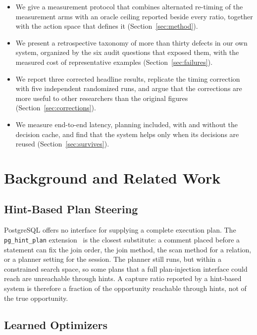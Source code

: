 \documentclass[conference]{IEEEtran}
\begin{document}
\begin{itemize}
  \item We give a measurement protocol that combines alternated re-timing of the
  measurement arms with an oracle ceiling reported beside every ratio, together
  with the action space that defines it (Section~\ref{sec:method}).
  \item We present a retrospective taxonomy of more than thirty defects in our
  own system, organized by the six audit questions that exposed them, with
  the measured cost of representative examples (Section~\ref{sec:failures}).
  \item We report three corrected headline results, replicate the timing
  correction with five independent randomized runs, and argue that the
  corrections are more useful to other researchers than the original figures
  (Section~\ref{sec:corrections}).
  \item We measure end-to-end latency, planning included, with and without the
  decision cache, and find that the system helps only when its decisions are
  reused (Section~\ref{sec:survives}).
\end{itemize}

\section{Background and Related Work}
\label{sec:related}

\subsection{Hint-Based Plan Steering}

PostgreSQL offers no interface for supplying a complete execution plan. The
\texttt{pg\_hint\_plan} extension~\cite{pghint} is the closest substitute: a
comment placed before a statement can fix the join order, the join method, the
scan method for a relation, or a planner setting for the session. The planner
still runs, but within a constrained search space, so some plans that a full
plan-injection interface could reach are unreachable through hints. A capture
ratio reported by a hint-based system is therefore a fraction of the
opportunity reachable through hints, not of the true opportunity.

\subsection{Learned Optimizers}
\end{document}
